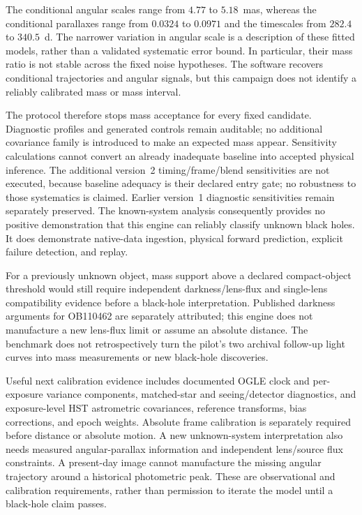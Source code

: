 The conditional angular scales range from $4.77$ to $5.18$~mas, whereas the
conditional parallaxes range from $0.0324$ to $0.0971$ and the timescales from
$282.4$ to $340.5$~d. The narrower variation in angular scale is a description of
these fitted models, rather than a validated systematic error bound. In
particular, their mass ratio is not stable across the fixed noise hypotheses.
The software recovers conditional trajectories and angular signals, but this
campaign does not identify a reliably calibrated mass or mass interval.

The protocol therefore stops mass acceptance for every fixed candidate. Diagnostic
profiles and generated controls remain auditable; no additional covariance family
is introduced to make an expected mass appear. Sensitivity calculations cannot
convert an already inadequate baseline into accepted physical inference.
The additional version~2 timing/frame/blend sensitivities are not executed,
because baseline adequacy is their declared entry gate; no robustness to those
systematics is claimed. Earlier version~1 diagnostic sensitivities remain
separately preserved. The
known-system analysis consequently provides no positive demonstration that this
engine can reliably classify unknown black holes. It does demonstrate native-data
ingestion, physical forward prediction, explicit failure detection, and replay.

For a previously unknown object, mass support above a declared compact-object
threshold would still require independent darkness/lens-flux and single-lens
compatibility evidence before a black-hole interpretation. Published darkness
arguments for OB110462 \cite{LamLu2023} are separately attributed; this engine
does not manufacture a new lens-flux limit or assume an absolute distance.
The benchmark does not retrospectively turn the pilot's two archival follow-up
light curves into mass measurements or new black-hole discoveries.

Useful next calibration evidence includes documented
OGLE clock and per-exposure variance components, matched-star and seeing/detector
diagnostics, and exposure-level HST astrometric covariances, reference transforms,
bias corrections, and epoch weights. Absolute frame calibration is separately
required before distance or absolute motion. A new unknown-system interpretation
also needs measured angular-parallax information and independent lens/source
flux constraints. A present-day image cannot manufacture the missing angular
trajectory around a historical photometric peak. These are observational and
calibration requirements, rather than permission to iterate the model until a
black-hole claim passes.

